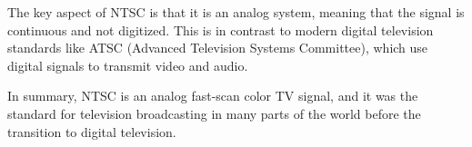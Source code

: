 The key aspect of NTSC is that it is an analog system, meaning that the signal is continuous and not digitized. This is in contrast to modern digital television standards like ATSC (Advanced Television Systems Committee), which use digital signals to transmit video and audio.

In summary, NTSC is an analog fast-scan color TV signal, and it was the standard for television broadcasting in many parts of the world before the transition to digital television.

